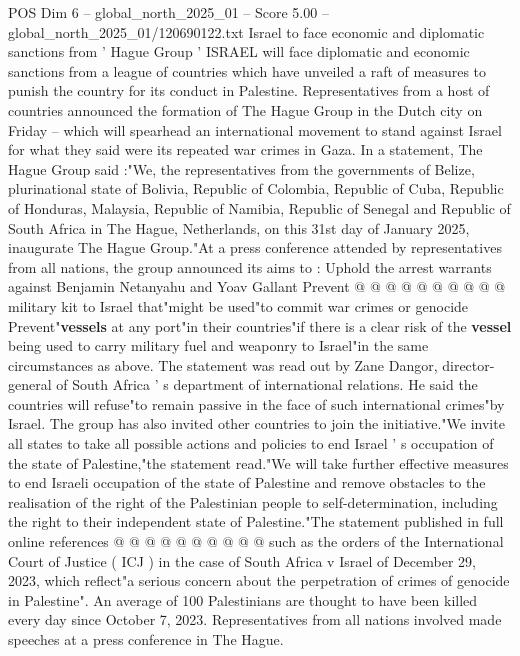 \begin{textsample}{POS Dim 6 – global\_north\_2025\_01 – Score 5.00 – global\_north\_2025\_01/120690122.txt}  \label{ex:f6_pos_277}
Israel to face economic and diplomatic sanctions from ' Hague Group ' ISRAEL will face diplomatic and economic sanctions from a league of countries which have unveiled a raft of measures to punish the country for its conduct in Palestine.
Representatives from a host of countries announced the formation of The Hague Group in the Dutch city on Friday -- which will spearhead an international movement to stand against Israel for what they said were its repeated war crimes in Gaza.
In a statement, The Hague Group said :"We, the representatives from the governments of Belize, plurinational state of Bolivia, Republic of Colombia, Republic of Cuba, Republic of Honduras, Malaysia, Republic of Namibia, Republic of Senegal and Republic of South Africa in The Hague, Netherlands, on this 31st day of January 2025, inaugurate The Hague Group."At a press conference attended by representatives from all nations, the group announced its aims to : Uphold the arrest warrants against Benjamin Netanyahu and Yoav Gallant Prevent @ @ @ @ @ @ @ @ @ @ military kit to Israel that"might be used"to commit war crimes or genocide Prevent"\textbf{vessels} at any port"in their countries"if there is a clear risk of the \textbf{vessel} being used to carry military fuel and weaponry to Israel"in the same circumstances as above.
The statement was read out by Zane Dangor, director-general of South Africa ' s department of international relations.
He said the countries will refuse"to remain passive in the face of such international crimes"by Israel.
The group has also invited other countries to join the initiative."We invite all states to take all possible actions and policies to end Israel ' s occupation of the state of Palestine,"the statement read."We will take further effective measures to end Israeli occupation of the state of Palestine and remove obstacles to the realisation of the right of the Palestinian people to self-determination, including the right to their independent state of Palestine."The statement published in full online references @ @ @ @ @ @ @ @ @ @ such as the orders of the International Court of Justice ( ICJ ) in the case of South Africa v Israel of December 29, 2023, which reflect"a serious concern about the perpetration of crimes of genocide in Palestine".
An average of 100 Palestinians are thought to have been killed every day since October 7, 2023.
Representatives from all nations involved made speeches at a press conference in The Hague.

\end{textsample}
